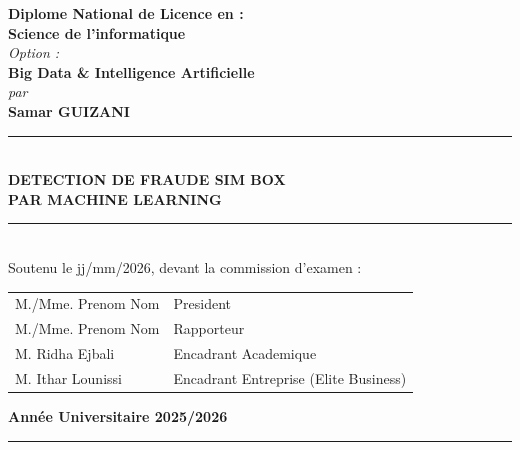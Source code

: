 \documentclass[12pt, oneside, a4paper]{report}
\newcommand{\academicYear}{2025/2026}
\begin{document}
\begin{titlepage}
\begin{center}
\textbf{Diplome National de Licence en :}\\
\textbf{Science de l'informatique}\\[0.3cm]

{\large \textit{Option :}}\\
\textbf{Big Data \& Intelligence Artificielle}\\[0.7cm]

{\large \textit{par}}\\[0.2cm]

{\Large\textbf{Samar GUIZANI}}\\[0.7cm]

\rule{0.5\textwidth}{1pt}\\[0.5cm]
{\LARGE\textbf{DETECTION DE FRAUDE SIM BOX}}\\[0.4cm]
{\LARGE\textbf{PAR MACHINE LEARNING}}
\rule{0.5\textwidth}{1pt}\\[0.7cm]

\large{Soutenu le jj/mm/2026, devant la commission d'examen :}\\[0.3cm]

\normalsize
\begin{tabular}{ll}
M./Mme. Prenom Nom & President \\
M./Mme. Prenom Nom & Rapporteur \\
M. Ridha Ejbali & Encadrant Academique \\
M. Ithar Lounissi & Encadrant Entreprise (Elite Business) \\
\end{tabular}

\vfill

\textbf{Année Universitaire \academicYear}
\end{center}
\restoregeometry
\end{titlepage}
\doublespacing{}
\setcounter{page}{1}

\clearpage
\thispagestyle{plain}

\noindent\rule[-0.2cm]{0.45cm}{1.2cm}\hspace{0.15cm}%
\raisebox{0.85cm}{\rule{0.85\textwidth}{0.5pt}}\\[0.3cm]
\noindent{}\\[2cm]
\end{document}
